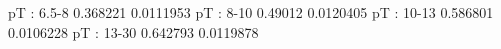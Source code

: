 pT : 6.5-8
0.368221 0.0111953
pT : 8-10
0.49012 0.0120405
pT : 10-13
0.586801 0.0106228
pT : 13-30
0.642793 0.0119878

